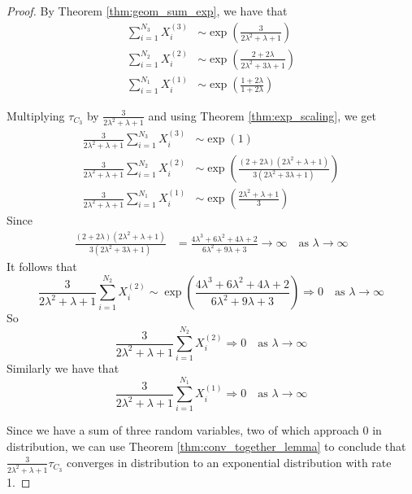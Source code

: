 \begin{proof}
By Theorem \eqref{thm:geom_sum_exp}, we have that
\begin{align*}
    \sum_{i = 1}^{N_3} X_i^{(3)} &\sim \exp\left(
        \frac{3}{2\lambda^2 + \lambda + 1}
        \right) \\
    \sum_{i = 1}^{N_2} X_i^{(2)} &\sim \exp\left(
        \frac{2 + 2\lambda}{2 \lambda^2 + 3\lambda + 1}
    \right)\\
    \sum_{i = 1}^{N_1} X_i^{(1)} &\sim \exp\left(\frac{1 + 2\lambda}{1 + 2\lambda}\right)
\end{align*}

Multiplying $\tau_{C_3}$ by $\frac{3}{2 \lambda^2 + \lambda + 1}$ and using Theorem \eqref{thm:exp_scaling}, we get
\begin{align*}
    \frac{3}{2 \lambda^2 + \lambda + 1} \sum_{i = 1}^{N_3} X_i^{(3)} &\sim \exp\left(
        1
        \right)\\
    \frac{3}{2 \lambda^2 + \lambda + 1} \sum_{i = 1}^{N_2} X_i^{(2)} &\sim \exp\left(
        \frac{(2 + 2\lambda)(2 \lambda^2 + \lambda + 1)}{3 (2 \lambda^2 + 3\lambda + 1)}
    \right)\\
    \frac{3}{2 \lambda^2 + \lambda + 1} \sum_{i = 1}^{N_1} X_i^{(1)} &\sim \exp\left(
        \frac{2 \lambda^2 + \lambda + 1}{3}
    \right)
\end{align*}
Since
\begin{align*}
    \frac{(2 + 2\lambda)(2 \lambda^2 + \lambda + 1)}{3 (2 \lambda^2 + 3\lambda + 1)} &= \frac{4\lambda^3 + 6 \lambda^2 + 4 \lambda + 2}{6\lambda^2 + 9\lambda + 3}
    \to \infty \quad \text{as } \lambda \to \infty
\end{align*}
It follows that
$$
    \frac{3}{2 \lambda^2 + \lambda + 1} \sum_{i = 1}^{N_2} X_i^{(2)} \sim \exp\left(
        \frac{4\lambda^3 + 6 \lambda^2 + 4 \lambda + 2}{6\lambda^2 + 9\lambda + 3}
    \right) \Rightarrow 0 \quad \text{as } \lambda \to \infty
$$
So
$$
\frac{3}{2 \lambda^2 + \lambda + 1} \sum_{i = 1}^{N_2} X_i^{(2)} \Rightarrow 0 \quad \text{as } \lambda \to \infty
$$
Similarly we have that
$$
\frac{3}{2 \lambda^2 + \lambda + 1} \sum_{i = 1}^{N_1} X_i^{(1)} \Rightarrow 0 \quad \text{as } \lambda \to \infty
$$

Since we have a sum of three random variables, two of which approach 0 in distribution, we can use Theorem \ref{thm:conv_together_lemma} to conclude that  $\frac{3}{2 \lambda^2 + \lambda + 1} \tau_{C_3}$ converges in distribution to an exponential distribution with rate 1.
\end{proof}

